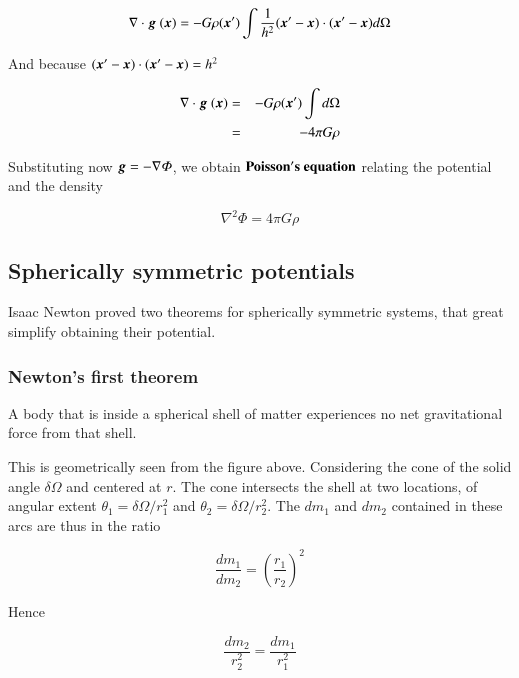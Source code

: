 \begin{equation}
\nabla \cdot {\boldsymbol{g}}\ ({\boldsymbol{x}}) =  -G \rho({\boldsymbol{x}}^\prime)\int \frac{1}{h^2}({\boldsymbol{x}}^\prime - {\boldsymbol{x}})\cdot ({\boldsymbol{x}}^\prime-{\boldsymbol{x}}) d\Omega
\end{equation}

And because $({\boldsymbol{x}}^\prime - {\boldsymbol{x}})\cdot ({\boldsymbol{x}}^\prime-{\boldsymbol{x}}) = h^2$

\begin{eqnarray}
\nabla \cdot {\boldsymbol{g}}\ ({\boldsymbol{x}}) &=&  -G \rho({\boldsymbol{x}}^\prime)\int d\Omega\\
&=&-4\pi G \rho
\end{eqnarray}

Substituting now ${\boldsymbol{g}} = -\nabla\varPhi$, we obtain $\bf{Poisson's \ equation}$ relating the potential and the density

\begin{equation}
\boxed{\nabla^2\varPhi=  4\pi G \rho}
\end{equation}

\subsection{Spherically symmetric potentials}

Isaac Newton proved two theorems for spherically symmetric systems, that great simplify obtaining their potential.

\subsubsection{Newton's first theorem}

A body that is inside a spherical shell of matter experiences no net gravitational force from that shell. 

This is geometrically seen from the figure above. Considering the cone of the solid angle $\delta \Omega$ and centered at $r$. The cone intersects the shell at two locations, of angular extent $\theta_1=\delta \Omega/r_1^2$ and $\theta_2=\delta \Omega/r_2^2$. The $dm_1$ and $dm_2$ contained in these arcs are thus in the ratio  


\begin{equation}
\frac{dm_1}{dm_2} = \left(\frac{r_1}{r_2}\right)^2
\end{equation}

Hence

\begin{equation}
\frac{dm_2}{r_2^2} = \frac{dm_1}{r_1^2} 
\end{equation}

